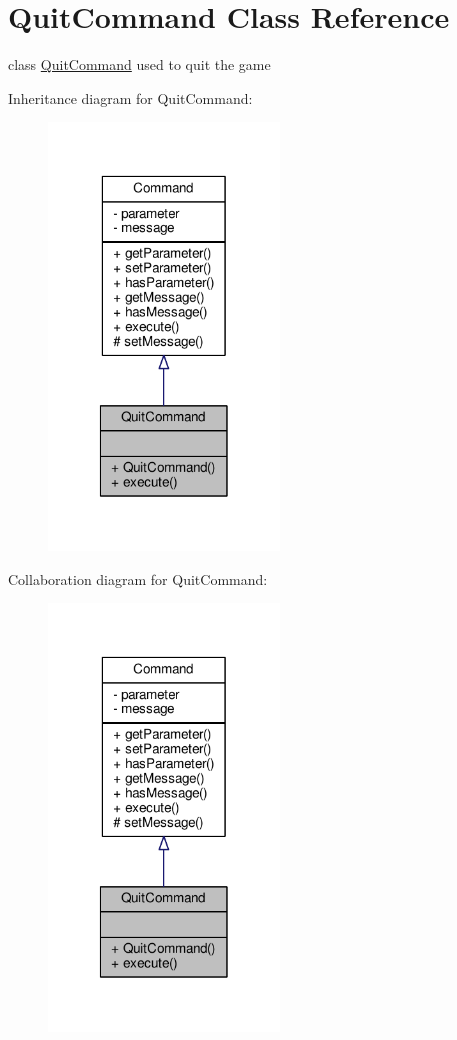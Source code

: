 \hypertarget{classQuitCommand}{\section{Quit\-Command Class Reference}
\label{classQuitCommand}
}


class \hyperlink{classQuitCommand}{Quit\-Command} used to quit the game  




Inheritance diagram for Quit\-Command\-:
\nopagebreak
\begin{figure}[H]
\begin{center}
\leavevmode
\includegraphics[width=174pt]{classQuitCommand__inherit__graph}
\end{center}
\end{figure}


Collaboration diagram for Quit\-Command\-:
\nopagebreak
\begin{figure}[H]
\begin{center}
\leavevmode
\includegraphics[width=174pt]{classQuitCommand__coll__graph}
\end{center}
\end{figure}
